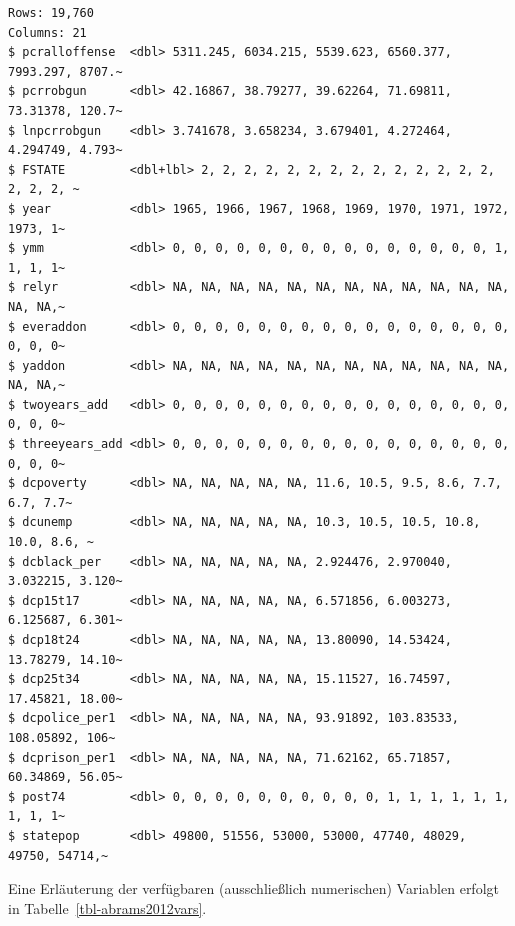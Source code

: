 \documentclass[
  a4paper,
  DIV=11,
  oneside]{scrreprt}
\begin{document}
\begin{verbatim}
Rows: 19,760
Columns: 21
$ pcralloffense  <dbl> 5311.245, 6034.215, 5539.623, 6560.377, 7993.297, 8707.~
$ pcrrobgun      <dbl> 42.16867, 38.79277, 39.62264, 71.69811, 73.31378, 120.7~
$ lnpcrrobgun    <dbl> 3.741678, 3.658234, 3.679401, 4.272464, 4.294749, 4.793~
$ FSTATE         <dbl+lbl> 2, 2, 2, 2, 2, 2, 2, 2, 2, 2, 2, 2, 2, 2, 2, 2, 2, ~
$ year           <dbl> 1965, 1966, 1967, 1968, 1969, 1970, 1971, 1972, 1973, 1~
$ ymm            <dbl> 0, 0, 0, 0, 0, 0, 0, 0, 0, 0, 0, 0, 0, 0, 0, 1, 1, 1, 1~
$ relyr          <dbl> NA, NA, NA, NA, NA, NA, NA, NA, NA, NA, NA, NA, NA, NA,~
$ everaddon      <dbl> 0, 0, 0, 0, 0, 0, 0, 0, 0, 0, 0, 0, 0, 0, 0, 0, 0, 0, 0~
$ yaddon         <dbl> NA, NA, NA, NA, NA, NA, NA, NA, NA, NA, NA, NA, NA, NA,~
$ twoyears_add   <dbl> 0, 0, 0, 0, 0, 0, 0, 0, 0, 0, 0, 0, 0, 0, 0, 0, 0, 0, 0~
$ threeyears_add <dbl> 0, 0, 0, 0, 0, 0, 0, 0, 0, 0, 0, 0, 0, 0, 0, 0, 0, 0, 0~
$ dcpoverty      <dbl> NA, NA, NA, NA, NA, 11.6, 10.5, 9.5, 8.6, 7.7, 6.7, 7.7~
$ dcunemp        <dbl> NA, NA, NA, NA, NA, 10.3, 10.5, 10.5, 10.8, 10.0, 8.6, ~
$ dcblack_per    <dbl> NA, NA, NA, NA, NA, 2.924476, 2.970040, 3.032215, 3.120~
$ dcp15t17       <dbl> NA, NA, NA, NA, NA, 6.571856, 6.003273, 6.125687, 6.301~
$ dcp18t24       <dbl> NA, NA, NA, NA, NA, 13.80090, 14.53424, 13.78279, 14.10~
$ dcp25t34       <dbl> NA, NA, NA, NA, NA, 15.11527, 16.74597, 17.45821, 18.00~
$ dcpolice_per1  <dbl> NA, NA, NA, NA, NA, 93.91892, 103.83533, 108.05892, 106~
$ dcprison_per1  <dbl> NA, NA, NA, NA, NA, 71.62162, 65.71857, 60.34869, 56.05~
$ post74         <dbl> 0, 0, 0, 0, 0, 0, 0, 0, 0, 0, 1, 1, 1, 1, 1, 1, 1, 1, 1~
$ statepop       <dbl> 49800, 51556, 53000, 53000, 47740, 48029, 49750, 54714,~
\end{verbatim}

Eine Erläuterung der verfügbaren (ausschließlich numerischen) Variablen
erfolgt in Tabelle~\ref{tbl-abrams2012vars}.

\begingroup
\setlength{}
\setlength{}\fontsize{12.0pt}{14.4pt}\selectfont
\end{document}
